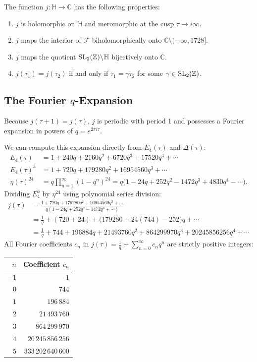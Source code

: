 \documentclass[a4paper]{article}
\begin{document}
\begin{theorem}[$j$ as a Hauptmodul]
The function $j: \mathbb{H} \to \mathbb{C}$ has the following properties:
\begin{enumerate}[label=(\roman*)]
 \item $j$ is holomorphic on $\mathbb{H}$ and meromorphic at the cusp $\tau \to i\infty$.
 \item $j$ maps the interior of $\mathcal{F}$ biholomorphically onto $\mathbb{C} \setminus (-\infty, 1728]$.
 \item $j$ maps the quotient $\mathrm{SL}_2(\mathbb{Z}) \backslash \mathbb{H}$ bijectively onto $\mathbb{C}$.
 \item $j(\tau_1) = j(\tau_2)$ if and only if $\tau_1 = \gamma \tau_2$ for some $\gamma \in \mathrm{SL}_2(\mathbb{Z})$.
\end{enumerate}
\end{theorem}

\subsection{The Fourier \texorpdfstring{$q$}{q}-Expansion}
Because $j(\tau + 1) = j(\tau)$, $j$ is periodic with period 1 and possesses a Fourier expansion in powers of $q = e^{2\pi i \tau}$. 

We can compute this expansion directly from $E_4(\tau)$ and $\Delta(\tau)$:
\begin{align}
 E_4(\tau) &= 1 + 240 q + 2160 q^2 + 6720 q^3 + 17520 q^4 + \cdots \\
 E_4(\tau)^3 &= 1 + 720 q + 179280 q^2 + 16954560 q^3 + \cdots \\
 \eta(\tau)^{24} &= q \prod_{n=1}^\infty (1 - q^n)^{24} = q \Big(1 - 24q + 252q^2 - 1472q^3 + 4830q^4 - \cdots\Big).
\end{align}
Dividing $E_4^3$ by $\eta^{24}$ using polynomial series division:
\begin{align}
 j(\tau) &= \frac{1 + 720 q + 179280 q^2 + 16954560 q^3 + \cdots}{q (1 - 24q + 252q^2 - 1472q^3 + \cdots)} \nonumber\\
 &= \frac{1}{q} + (720 + 24) + \Big(179280 + 24(744) - 252\Big) q + \cdots \nonumber\\
 &= \frac{1}{q} + 744 + 196884 q + 21493760 q^2 + 864299970 q^3 + 20245856256 q^4 + \cdots
 \label{eq:j_q_series_full}
\end{align}
All Fourier coefficients $c_n$ in $j(\tau) = \frac{1}{q} + \sum_{n=0}^\infty c_n q^n$ are strictly positive integers:
\begin{center}
\begin{tabular}{r r}
\toprule
$n$ & Coefficient $c_n$ \\
\midrule
$-1$ & $1$ \\
$0$ & $744$ \\
$1$ & $196\,884$ \\
$2$ & $21\,493\,760$ \\
$3$ & $864\,299\,970$ \\
$4$ & $20\,245\,856\,256$ \\
$5$ & $333\,202\,640\,600$ \\
\bottomrule
\end{tabular}
\end{center}
\end{document}
